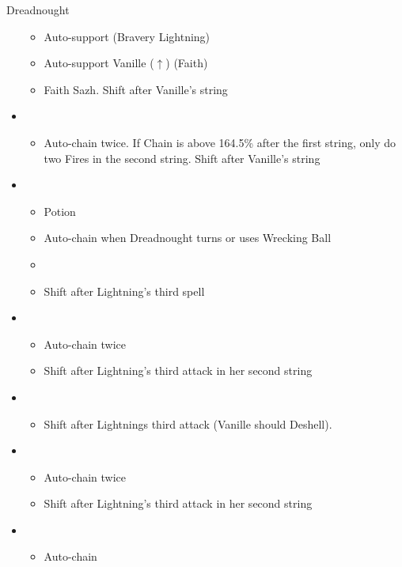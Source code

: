 \begin{battle}[2:16]{Dreadnought}
\begin{multicols}{2}
\begin{itemize}
			      \begin{itemize}
				      \item Auto-support (Bravery Lightning)
				      \item Auto-support Vanille ($\uparrow$) (Faith)
				      \item Faith Sazh. Shift after Vanille's string
			      \end{itemize}
			\item \fifth
			      \begin{itemize}
				      \item Auto-chain twice. If Chain is above 164.5\% after the first string, only do two Fires in the second string. Shift after Vanille's string
			      \end{itemize}
			\item \fourth
			      \begin{itemize}
				      \item Potion
				      \item Auto-chain when Dreadnought turns or uses Wrecking Ball
				      \item \stagger
				      \item Shift after Lightning's third spell
			      \end{itemize}
			\item \first
			      \begin{itemize}
				      \item Auto-chain twice
				      \item Shift after Lightning's third attack in her second string
			      \end{itemize}
			\item \second
			      \begin{itemize}
				      \item Shift after Lightnings third attack (Vanille should Deshell).
			      \end{itemize}
			\item \first
			      \begin{itemize}
				      \item Auto-chain twice
				      \item Shift after Lightning's third attack in her second string
			      \end{itemize}
			\item \third
			      \begin{itemize}
				      \item Auto-chain
			      \end{itemize}
		\end{itemize}
	\end{multicols}
\end{battle}
